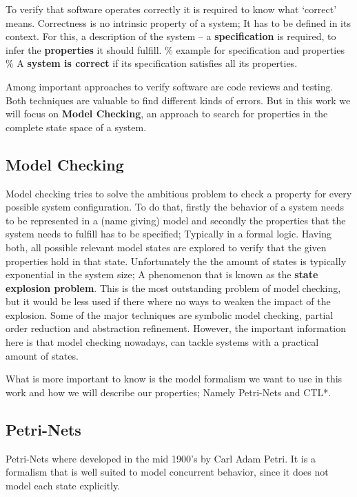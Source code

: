 To verify that software operates correctly it is required to know what `correct' means.
Correctness is no intrinsic property of a system;
It has to be defined in its context.
For this, a description of the system -- a \textbf{specification} is required, to infer the \textbf{properties} it should fulfill.
\% example for specification and properties \%
A \textbf{system is correct} if its specification satisfies all its properties\cite[Chapter 1]{baier2008principles}.

Among important approaches to verify software are code reviews and testing.
Both techniques are valuable to find different kinds of errors.
But in this work we will focus on \textbf{Model Checking}, an approach to search for properties in the complete state space of a system.

\subsection{Model Checking}
Model checking tries to solve the ambitious problem to check a property for every possible system configuration.
To do that, firstly the behavior of a system needs to be represented in a (name giving) model
and secondly the properties that the system needs to fulfill has to be specified;
Typically in a formal logic.
Having both, all possible relevant model states are explored to verify that the given properties hold in that state.
Unfortunately the the amount of states is typically exponential in the system size;
A phenomenon that is known as the \textbf{state explosion problem}\cite[Introduction]{mcmillan1993symbolic}.
This is the most outstanding problem of model checking, but it would be less used if there where no ways to weaken the impact of the explosion.
Some of the major techniques are symbolic model checking, partial order reduction and abstraction refinement\cite[Chapter 5]{clarke2011model}.
However, the important information here is that model checking nowadays, can tackle systems with a practical amount of states.

What is more important to know is the model formalism we want to use in this work and how we will describe our properties; Namely Petri-Nets and CTL*.

\subsection{Petri-Nets}
\label{rel_petri}
Petri-Nets where developed in the mid 1900's by Carl Adam Petri\cite{petri1962kommunikation}.
It is a formalism that is well suited to model concurrent behavior, since it does not model each state explicitly.

